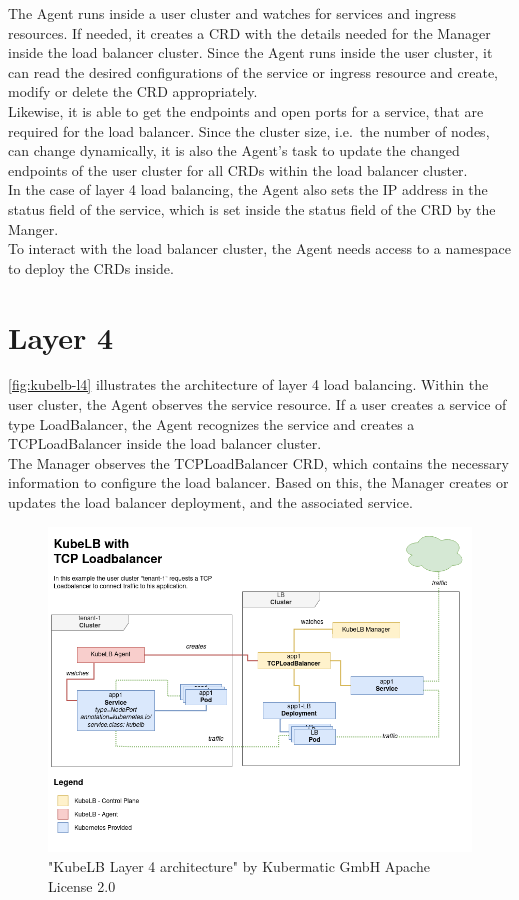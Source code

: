 The Agent runs inside a user cluster and watches for services and ingress resources.
If needed, it creates a CRD with the details needed for the Manager inside the load balancer cluster.
Since the Agent runs inside the user cluster, it can read the desired configurations of the service or ingress resource and create, modify or delete the CRD appropriately.
\\
Likewise, it is able to get the endpoints and open ports for a service, that are required for the load balancer.
Since the cluster size, i.e.\ the number of nodes, can change dynamically, it is also the Agent's task to update the changed endpoints of the user cluster for all CRDs within the load balancer cluster.
\\
In the case of layer 4 load balancing, the Agent also sets the IP address in the status field of the service, which is set inside the status field of the CRD by the Manger.
\\
To interact with the load balancer cluster, the Agent needs access to a namespace to deploy the CRDs inside.

\section{Layer 4}

\autoref{fig:kubelb-l4} illustrates the architecture of layer 4 load balancing.
Within the user cluster, the Agent observes the service resource.
If a user creates a service of type LoadBalancer, the Agent recognizes the service and creates a TCPLoadBalancer inside the load balancer cluster.
\\
The Manager observes the TCPLoadBalancer CRD, which contains the necessary information to configure the load balancer.
Based on this, the Manager creates or updates the load balancer deployment, and the associated service.


\begin{figure}[H]
    \centering
    \includegraphics[width=1\linewidth]{media/06/kubelb-l4}
    \caption{"KubeLB Layer 4 architecture" by Kubermatic GmbH Apache License 2.0}
    \label{fig:kubelb-l4}
\end{figure}

